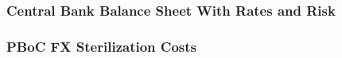 \documentclass{beamer}
\begin{document}
\begin{frame}
\frametitle{Central Bank Balance Sheet With Rates and Risk}
\end{frame}


\begin{frame}
\frametitle{PBoC FX Sterilization Costs}
\end{frame}
\end{document}

